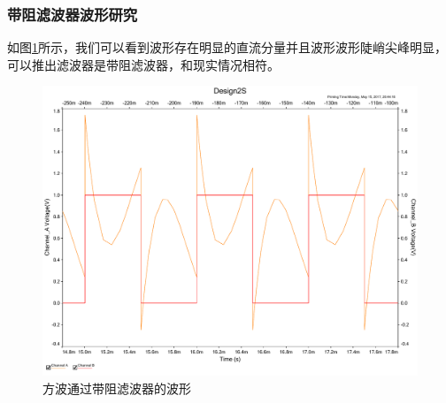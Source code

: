 \documentclass[UTF8,a4paper]{paper}
\begin{document}
\begin{multicols}{2}
\subsubsection{带阻滤波器波形研究}
如图\ref{BIS}所示，我们可以看到波形存在明显的直流分量并且波形波形陡峭尖峰明显，可以推出滤波器是带阻滤波器，和现实情况相符。
\begin{figure}[H]
\centering
\includegraphics[width=\columnwidth]{2S.pdf}
\caption{方波通过带阻滤波器的波形}
\label{BIS}
\end{figure}

\end{multicols}
\end{document}
